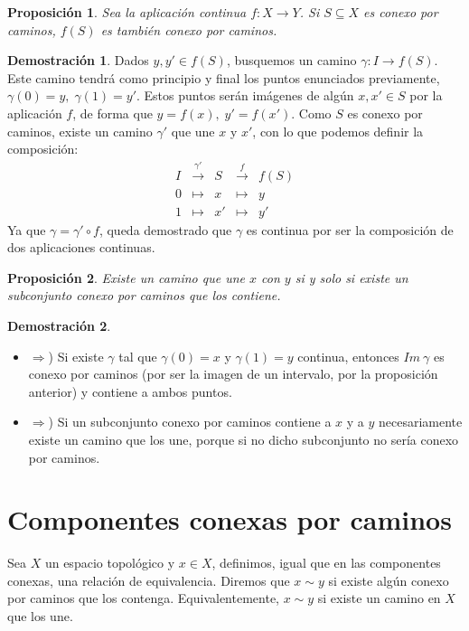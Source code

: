 \documentclass[12pt,twoside]{report}
\theoremstyle{azul}
\theoremstyle{azul2}
\theoremstyle{plain}
\newtheorem*{prop}{Proposición}
\theoremstyle{definition}
\newtheorem*{dem}{Demostración}
\theoremstyle{remark}
\begin{document}
\begin{prop}
Sea la aplicación continua $f: X \longrightarrow Y$. Si $S \subseteq X$ es conexo por caminos, $f(S)$ es también conexo por caminos.
\end{prop}
\begin{dem}
Dados $y,y' \in f(S)$, busquemos un camino $\gamma: I \longrightarrow f(S)$. Este camino tendrá como principio y final los puntos enunciados previamente, $\gamma(0)=y, \; \gamma(1)=y'$. Estos puntos serán imágenes de alg{\'u}n $x, x' \in S$ por la aplicación $f$, de forma que $y=f(x),\; y'=f(x')$. Como $S$ es conexo por caminos, existe un camino $\gamma'$ que une $x$ y $x'$, con lo que podemos definir la composición:
$$\begin{array}{rcccl}
    I & \stackrel{\gamma'}{\longrightarrow} & S & \stackrel{f}{\longrightarrow} & f(S)   \\
    0 & \longmapsto & x & \longmapsto & y \\
    1 & \longmapsto & x' & \longmapsto & y'
    \end{array}$$
Ya que $\gamma=\gamma' \circ f$, queda demostrado que $\gamma$ es continua por ser la composición de dos aplicaciones continuas.
\end{dem}
\begin{prop} 
Existe un camino que une $x$ con $y$ si y solo si existe un subconjunto conexo por caminos que los contiene. 

\end{prop}
\begin{dem}
\begin{itemize}
 \item $\Rightarrow$) Si existe $\gamma$ tal que $\gamma(0)=x$ y $\gamma(1)=y$ continua, entonces $Im \: \gamma$ es conexo por caminos (por ser la imagen de un intervalo, por la proposición anterior) y contiene a ambos puntos.
    \item $\Rightarrow$) Si un subconjunto conexo por caminos contiene a $x$ y a $y$ necesariamente existe un camino que los une, porque si no dicho subconjunto no sería conexo por caminos.



\end{itemize}
\end{dem}


\section{Componentes conexas por caminos}
Sea $X$ un espacio topológico y $x \in X$, definimos, igual que en las componentes conexas, una relación de equivalencia. Diremos que $x \sim y $ si existe algún conexo por caminos que los contenga. Equivalentemente, $x \sim y $ si existe un camino en $X$ que los une. 
\end{document}
